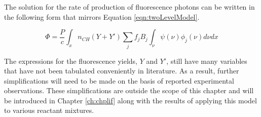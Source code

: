 The solution for the rate of production of fluorescence photons can be written in the following form that mirrors Equation \ref{eqn:twoLevelModel}.

\begin{equation}
  \Phi = \frac{P}{c} \int_x n_{CH} (Y + Y') \sum_j f_j B_j \int_\nu \psi(\nu) \phi_j(\nu) d\nu dx
  \label{eqn:improvedModel}
\end{equation}

The expressions for the fluorescence yields, \(Y\) and \(Y'\), still have many variables that have not been tabulated conveniently in literature.
As a result, further simplifications will need to be made on the basis of reported experimental observations.
These simplifications are outside the scope of this chapter and will be introduced in Chapter \ref{ch:chplif} along with the results of applying this model to various reactant mixtures.

